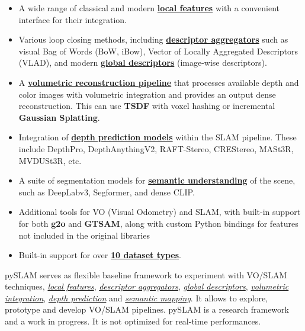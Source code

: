 \documentclass{article}
\begin{document}
\begin{itemize}
    \item A wide range of classical and modern
    \textbf{\protect\hyperlink{supported-local-features}{local features}}
    with a convenient interface for their integration. 
    
    \item Various loop closing methods, including
    \textbf{\protect\hyperlink{supported-global-descriptors-and-local-descriptor-aggregation-methods}{descriptor
    aggregators}} such as visual Bag of Words (BoW, iBow), Vector of Locally
    Aggregated Descriptors (VLAD), and modern
    \textbf{\protect\hyperlink{supported-global-descriptors-and-local-descriptor-aggregation-methods}{global
    descriptors}} (image-wise descriptors).
    
    \item A
    \textbf{\protect\hyperlink{volumetric-reconstruction}{volumetric
    reconstruction pipeline}} that processes available depth and color
    images with volumetric integration and provides an output dense
    reconstruction. This can use \textbf{TSDF} with voxel hashing or
    incremental \textbf{Gaussian Splatting}.
    
    \item Integration of
    \textbf{\protect\hyperlink{depth-prediction}{depth prediction models}}
    within the SLAM pipeline. These include DepthPro, DepthAnythingV2,
    RAFT-Stereo, CREStereo, MASt3R, MVDUSt3R, etc.

    \item A suite of segmentation models for
    \textbf{\protect\hyperlink{semantic-mapping}{semantic understanding}} of
    the scene, such as DeepLabv3, Segformer, and dense CLIP.
    
    \item Additional tools for VO (Visual Odometry) and SLAM, with built-in
    support for both \textbf{g2o} and \textbf{GTSAM}, along with custom
    Python bindings for features not included in the original libraries

    \item Built-in support for over \textbf{\protect\hyperlink{datasets}{10 dataset
    types}}.
\end{itemize}

pySLAM serves as flexible baseline framework to experiment with VO/SLAM
techniques, \emph{\protect\hyperlink{supported-local-features}{local
features}},
\emph{\protect\hyperlink{supported-global-descriptors-and-local-descriptor-aggregation-methods}{descriptor
aggregators}},
\emph{\protect\hyperlink{supported-global-descriptors-and-local-descriptor-aggregation-methods}{global
descriptors}},
\emph{\protect\hyperlink{volumetric-reconstruction-pipeline}{volumetric
integration}}, \emph{\protect\hyperlink{depth-prediction}{depth
prediction}} and \emph{\protect\hyperlink{semantic-mapping}{semantic
mapping}}. It allows to explore, prototype and develop VO/SLAM
pipelines. pySLAM is a research framework and a work in progress. It is
not optimized for real-time performances.
\end{document}
